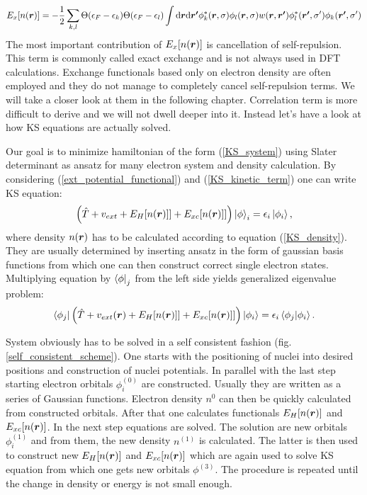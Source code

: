 \documentclass[openany, longbibliography,slovene,a4paper,12pt]{article}
\def\vec#1{\mbox{\boldmath$#1$}}
\newcommand{\dif}{\mathrm{d}}
\begin{document}
\begin{equation}
  E_{x}[n(\vec r)]=-\frac{1}{2}\sum_{k,l}\Theta(\epsilon_F-\epsilon_k)\Theta(\epsilon_F-\epsilon_l)\int \dif \vec{r} \dif \vec{r'}\phi^*_k(\vec r, \sigma)\phi_l(\vec{r}, \sigma)w(\vec{r},\vec{r'})\phi^*_l(\vec{r'}, \sigma')\phi_k(\vec{r'}, \sigma')
\end{equation}
The most important contribution of $E_{x}[n(\vec r)]$ is cancellation of
self-repulsion. This term is commonly called exact exchange and is not always
used in DFT calculations. Exchange functionals based only on
electron density are often employed and they do not manage to completely cancel
self-repulsion terms. We will take a closer look at them in the following chapter.
Correlation term is more difficult to derive and we will not dwell deeper into
it. Instead let's have a look at how KS equations are actually solved.

Our goal is to minimize hamiltonian of the form (\ref{KS_system}) using Slater
determinant as ansatz for many electron system and density calculation. By
considering (\ref{ext_potential_functional}) and (\ref{KS_kinetic_term}) one can
write KS equation:  
\begin{equation}
  \left( \hat T + v_{ext} + E_H[n(\vec r)]]  + E_{xc}[n(\vec r)]] \right) \ket \phi_i =  \epsilon_i \ket{\phi_i},  
\end {equation}
where density $n(\vec r)$  has to be calculated according to equation
(\ref{KS_density}). They are usually determined by inserting ansatz in the
form of gaussian basis functions from which one can
then construct correct single electron states. Multiplying equation by $\bra
\phi_j$ from the left side yields generalized eigenvalue problem:
\begin{equation}
  \bra {\phi_j} \left( \hat T + v_{ext}(\vec r) + E_H[n(\vec r)]]  + E_{xc}[n(\vec r)]] \right) \ket{\phi_i} =  \epsilon_i \braket{ \phi_j |\phi_i }.
\end {equation}

System obviously has to be solved in a self consistent fashion
(fig. \ref{self_consistent_scheme}). One starts with the positioning of nuclei into
desired positions and construction of nuclei potentials. In parallel with the
last step starting electron orbitals $\phi^{(0)}_i$ are constructed. Usually they are written
as a series of Gaussian functions. Electron density $n^0$ can then be quickly
calculated from constructed orbitals. After that one
calculates functionals $E_H[n(\vec r)]$ and $E_{xc}[n(\vec r)]$. In the next step
equations are solved. The solution are new orbitals $\phi_i^{(1)}$  and from
them, the new density $n^{(1)}$ is calculated. The latter is then used to construct new $E_H[n(\vec r)]$ and $E_{xc}[n(\vec r)]$ which are again used to
solve KS equation from which one gets new orbitals $\phi^{(3)}$. The procedure is
repeated until the change in density or energy is not small enough. 
\end{document}
